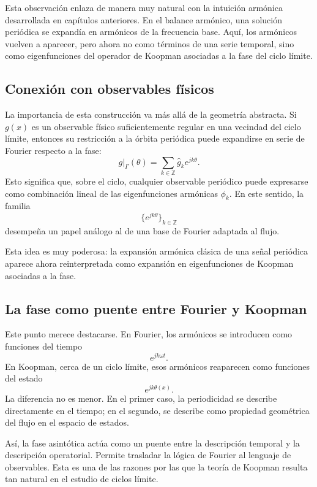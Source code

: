 Esta observación enlaza de manera muy natural con la intuición armónica desarrollada en capítulos anteriores. En el balance armónico, una solución periódica se expandía en armónicos de la frecuencia base. Aquí, los armónicos vuelven a aparecer, pero ahora no como términos de una serie temporal, sino como eigenfunciones del operador de Koopman asociadas a la fase del ciclo límite.

\subsection{Conexión con observables físicos}

La importancia de esta construcción va más allá de la geometría abstracta. Si \(g(x)\) es un observable físico suficientemente regular en una vecindad del ciclo límite, entonces su restricción a la órbita periódica puede expandirse en serie de Fourier respecto a la fase:
\begin{equation}
g|_{\Gamma}(\theta)=\sum_{k\in\mathbb{Z}} \hat{g}_k e^{jk\theta}.
\label{eq:Koopman_phase_fourier_on_cycle}
\end{equation}
Esto significa que, sobre el ciclo, cualquier observable periódico puede expresarse como combinación lineal de las eigenfunciones armónicas \(\phi_k\). En este sentido, la familia
\[
\{e^{jk\theta}\}_{k\in\mathbb{Z}}
\]
desempeña un papel análogo al de una base de Fourier adaptada al flujo.

Esta idea es muy poderosa: la expansión armónica clásica de una señal periódica aparece ahora reinterpretada como expansión en eigenfunciones de Koopman asociadas a la fase.

\subsection{La fase como puente entre Fourier y Koopman}

Este punto merece destacarse. En Fourier, los armónicos se introducen como funciones del tiempo
\[
e^{jk\omega t}.
\]
En Koopman, cerca de un ciclo límite, esos armónicos reaparecen como funciones del estado
\[
e^{jk\theta(x)}.
\]
La diferencia no es menor. En el primer caso, la periodicidad se describe directamente en el tiempo; en el segundo, se describe como propiedad geométrica del flujo en el espacio de estados.

Así, la fase asintótica actúa como un puente entre la descripción temporal y la descripción operatorial. Permite trasladar la lógica de Fourier al lenguaje de observables. Esta es una de las razones por las que la teoría de Koopman resulta tan natural en el estudio de ciclos límite.

